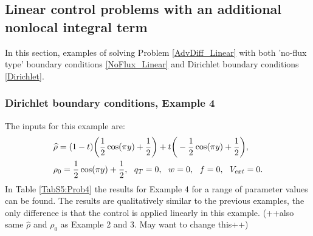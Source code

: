 

\subsection{Linear control problems with an additional nonlocal integral term}
In this section, examples of solving Problem \eqref{AdvDiff_Linear} with both 'no-flux type' boundary conditions \eqref{NoFlux_Linear} and Dirichlet boundary conditions \eqref{Dirichlet}.
\subsubsection{Dirichlet boundary conditions, Example 4}
The inputs for this example are:
\begin{align*}
&\widehat \rho = (1 - t)\bigg(\frac{1}{2}\cos(\pi y) + \frac{1}{2}\bigg)  + t\bigg(-\frac{1}{2}\cos(\pi y) + \frac{1}{2}\bigg),\\
&\rho_{0} = \frac{1}{2}\cos(\pi y) + \frac{1}{2},\ \
q_{T} = 0,\ \
{w} = 0,\ \
f =0, \ \
V_{ext} =0.
\end{align*}
In Table \ref{TabS5:Prob4} the results for Example 4 for a range of parameter values can be found. The results are qualitatively similar to the previous examples, the only difference is that the control is applied linearly in this example. (++also same $\widehat \rho$ and $\rho_0$ as Example 2 and 3. May want to change this++)

